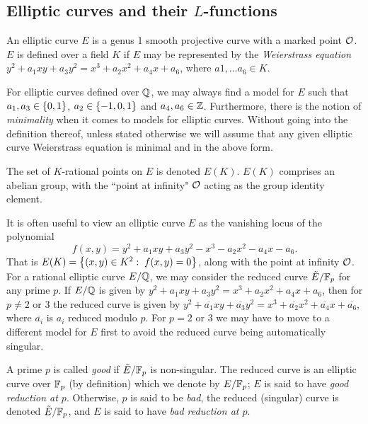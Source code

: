\subsection{Elliptic curves and their $L$-functions}

\begin{definition}
An elliptic curve $E$ is a genus 1 smooth projective curve with a marked point $\mathcal{O}$. $E$ is defined over a field $K$ if $E$ may be represented by the {\it Weierstrass equation} $y^2 + a_1 xy + a_3 y^2 = x^3 + a_2 x^2 + a_4 x + a_6$, where $a1,\ldots a_6 \in K$.
\end{definition}

For elliptic curves defined over $\mathbb{Q}$, we may always find a model for $E$ such that $a_1, a_3 \in \left\{0,1\right\}$, $a_2 \in \left\{-1,0,1\right\}$ and $a_4,a_6 \in \mathbb{Z}$. Furthermore, there is the notion of {\it minimality} when it comes to models for elliptic curves. Without going into the definition thereof, unless stated otherwise we will assume that any given elliptic curve Weierstrass equation is minimal and in the above form.

\begin{definition}
The set of $K$-rational points on $E$ is denoted $E(K)$. $E(K)$ comprises an abelian group, with the ``point at infinity" $\mathcal{O}$ acting as the group identity element.
\end{definition}

It is often useful to view an elliptic curve $E$ as the vanishing locus of the polynomial
\begin{equation}\label{eqn:E_poly}
f(x,y) = y^2 + a_1 xy + a_3 y^2 - x^3 - a_2 x^2 - a_4 x - a_6.
\end{equation}
 That is $E(K) = \left\{(x,y) \in K^2: \; f(x,y) = 0\right\}$, along with the point at infinity $\mathcal{O}$. \\

For a rational elliptic curve $E/\mathbb{Q}$, we may consider the reduced curve $\tilde{E}/\mathbb{F}_p$ for any prime $p$. If $E/\mathbb{Q}$ is given by $y^2 + a_1 xy + a_3 y^2 = x^3 + a_2 x^2 + a_4 x + a_6$, then for $p\ne 2$ or $3$ the reduced curve is given by $y^2 + \overline{a_1} xy + \overline{a_3} y^2 = x^3 + \overline{a_2} x^2 + \overline{a_4} x + \overline{a_6}$, where $\overline{a_i}$ is $a_i$ reduced modulo $p$. For $p = 2$ or $3$ we may have to move to a different model for $E$ first to avoid the reduced curve being automatically singular.

\begin{definition}
A prime $p$ is called {\it good} if $\tilde{E}/\mathbb{F}_p$ is non-singular. The reduced curve is an elliptic curve over $\mathbb{F}_p$ (by definition) which we denote by $E/\mathbb{F}_p$; $E$ is said to have {\it good reduction at $p$}. Otherwise, $p$ is said to be {\it bad}, the reduced (singular) curve is denoted $\tilde{E}/\mathbb{F}_p$, and $E$ is said to have {\it bad reduction at $p$}.
\end{definition}

